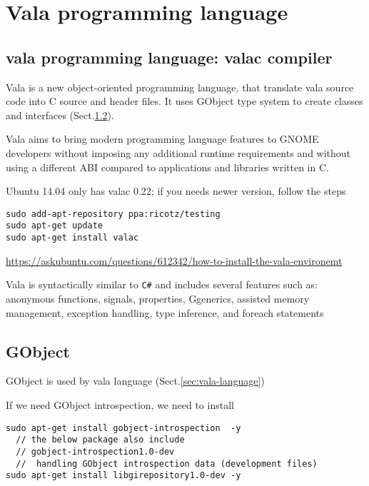 \chapter{Vala programming language}
\label{chap:vala-language}


\section{vala programming language: valac compiler}
\label{sec:valac}
\label{sec:vala-language}

Vala is a new object-oriented programming language, that translate vala source
code into C source and header files. It uses GObject type system to create classes and
interfaces (Sect.\ref{sec:GObject}).

Vala aims to bring modern programming language features to GNOME developers
without imposing any additional runtime requirements and without using a
different ABI compared to applications and libraries written in C.

Ubuntu 14.04 only has valac 0.22; if you needs newer version, follow the steps
\begin{verbatim}
sudo add-apt-repository ppa:ricotz/testing 
sudo apt-get update
sudo apt-get install valac
\end{verbatim}
\url{https://askubuntu.com/questions/612342/how-to-install-the-vala-environemt}

Vala is syntactically similar to \verb!C#! and includes several features such
as:
anonymous functions, signals, properties, Ggenerics, assisted memory management,
exception handling, type inference, and foreach statements 


\section{GObject}
\label{sec:GObject}

GObject is used by vala language (Sect.\ref{sec:vala-language})

If we need GObject introspection, we need to install
\begin{verbatim}
sudo apt-get install gobject-introspection  -y
  // the below package also include
  // gobject-introspection1.0-dev 
  //  handling GObject introspection data (development files)
sudo apt-get install libgirepository1.0-dev -y 
\end{verbatim}